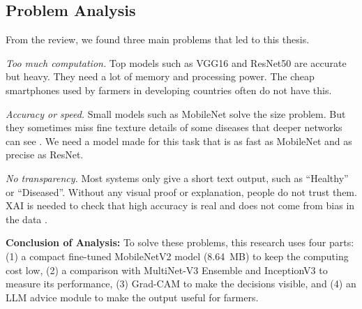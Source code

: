 \subsection{Problem Analysis}
From the review, we found three main problems that led to this thesis.

\textit{Too much computation.} Top models such as VGG16 \cite{ferentinos2018deep} and ResNet50 \cite{he2016deep} are accurate but heavy. They need a lot of memory and processing power. The cheap smartphones used by farmers in developing countries often do not have this.

\textit{Accuracy or speed.} Small models such as MobileNet solve the size problem. But they sometimes miss fine texture details of some diseases that deeper networks can see \cite{kc2019depthwise, too2019comparative}. We need a model made for this task that is as fast as MobileNet and as precise as ResNet.

\textit{No transparency.} Most systems only give a short text output, such as ``Healthy'' or ``Diseased''. Without any visual proof or explanation, people do not trust them. XAI is needed to check that high accuracy is real and does not come from bias in the data \cite{ryo2022explainable, amara2017deep}.

\noindent \textbf{Conclusion of Analysis:} To solve these problems, this research uses four parts: (1) a compact fine-tuned MobileNetV2 model (8.64~MB) to keep the computing cost low, (2) a comparison with MultiNet-V3 Ensemble and InceptionV3 to measure its performance, (3) Grad-CAM to make the decisions visible, and (4) an LLM advice module to make the output useful for farmers.
